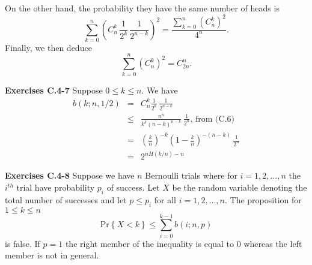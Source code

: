 \documentclass[a4paper,12pt]{article}
\newcommand{\newpar}[1]
{\bigskip \noindent \textbf{Exercises #1} \newline}
\newcommand{\prob}[1]{\mathrm{Pr}\left\{ #1 \right\}}
\begin{document}
On the other hand, the probability they have the same number of heads
is
\[ \sum_{k=0}^n \left(C_n^k\,\frac{1}{2^k}\,\frac{1}{2^{n-k}}\right)^2 =
\frac{\sum_{k=0}^n\left(C_n^k\right)^2}{4^n}.\]
Finally, we then deduce
\[ \sum_{k=0}^n\left(C_n^k\right)^2 = C_{2n}^n.\]

\newpar{C.4-7}
Suppose $0 \le k\le n$.  We have
\begin{eqnarray*}
  b(k;n,1/2) &=& C_n^k \frac{1}{2^k}\,\frac{1}{2^{n-k}} \\
  &\le& \frac{n^n}{k^k(n-k)^{n-k}}\,\frac{1}{2^n},
  \,\mbox{from (C.6)}\\ &=&
  \left(\frac{k}{n}\right)^{-k}\left(1-\frac{k}{n}\right)^{-(n-k)}\,
  \frac{1}{2^n} \\
  &=& 2^{nH(k/n)-n}
\end{eqnarray*}

\newpar{C.4-8}
Suppose we have $n$ Bernoulli trials where for $i = 1,2,\ldots,n$ the
$i^{th}$ trial have probability $p_i$ of success.  Let $X$ be the
random variable denoting the total number of successes and let $p \le
p_i$ for all $i = 1,2,\ldots,n$.  The proposition for $1\le k\le n$
\[\prob{X < k} \le \sum_{i=0}^{k-1}b(i;n,p)\]
is false.  If $p=1$ the right member of the inequality is equal to $0$
whereas the left member is not in general.
\end{document}
